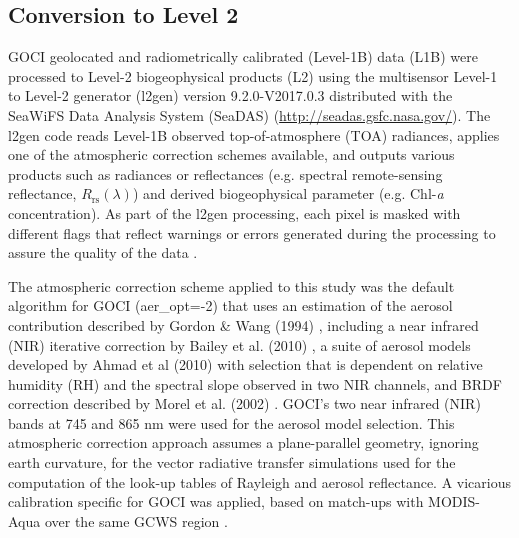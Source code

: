 \documentclass[remotesensing,article,submit,moreauthors,pdftex,10pt,a4paper]{Definitions/mdpi}
\begin{document}
\subsection{Conversion to Level 2}
GOCI geolocated and radiometrically calibrated (Level-1B) data (L1B) were processed to Level-2 biogeophysical products (L2) using the multisensor Level-1 to Level-2 generator (l2gen) version 9.2.0-V2017.0.3 distributed with the SeaWiFS Data Analysis System (SeaDAS) (\url{http://seadas.gsfc.nasa.gov/}). The l2gen code reads Level-1B observed top-of-atmosphere (TOA) radiances, applies one of the atmospheric correction schemes available, and outputs various products such as radiances or reflectances (e.g. spectral remote-sensing reflectance, $R_\text{rs}(\lambda)$) and derived biogeophysical parameter (e.g. Chl-{\it a} concentration). As part of the l2gen processing, each pixel is masked with different flags that reflect warnings or errors generated during the processing to assure the quality of the data \cite{Bailey2006}.


The atmospheric correction scheme applied to this study was the default algorithm \cite{Mobley2016} for GOCI (aer\_opt=-2) that uses an estimation of the aerosol contribution described by Gordon \& Wang (1994) \cite{Gordon1994}, including a near infrared (NIR) iterative correction by Bailey et al. (2010) \cite{Bailey2010}, a suite of aerosol models developed by Ahmad et al (2010) \cite{Ahmad2010} with selection that is dependent on relative humidity (RH) and the spectral slope observed in two NIR channels, and BRDF correction described by Morel et al. (2002) \cite{Morel2002}. GOCI's two near infrared (NIR) bands at 745 and 865 nm were used for the aerosol model selection. This atmospheric correction approach assumes a plane-parallel geometry, ignoring earth curvature, for the vector radiative transfer simulations used for the computation of the look-up tables of Rayleigh and aerosol reflectance. A vicarious calibration specific for GOCI was applied, based on match-ups with MODIS-Aqua over the same GCWS region \cite{Concha_2018a}. 
\end{document}
